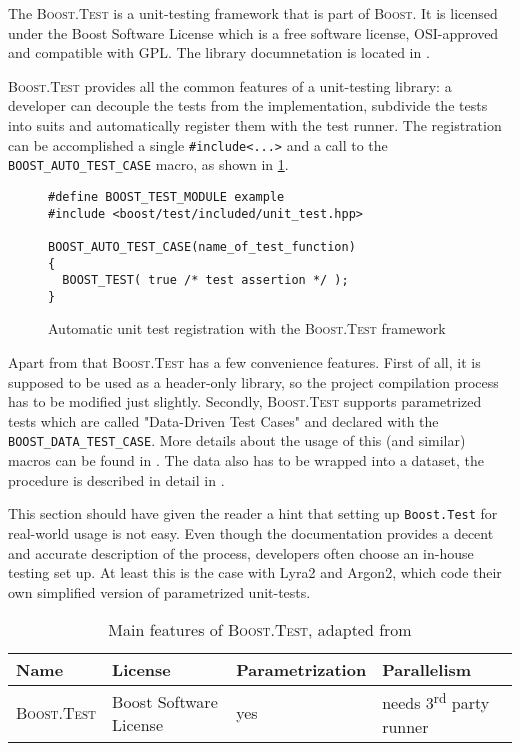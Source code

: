 The \textsc{Boost.Test} is a unit-testing framework that is part of \textsc{Boost}. It is licensed under the Boost Software License which is a free software license, OSI-approved and compatible with GPL. The library documnetation is located in \cite{boost:2017:test-docs}.

\textsc{Boost.Test} provides all the common features of a unit-testing library: a developer can decouple the tests from the implementation, subdivide the tests into suits and automatically register them with the test runner. The registration can be accomplished a single \texttt{#include<...>} and a call to the \texttt{BOOST_AUTO_TEST_CASE} macro, as shown in \ref{figure:boost-auto-test-case}.

\begin{figure}
\centering
\begin{verbatim}
#define BOOST_TEST_MODULE example
#include <boost/test/included/unit_test.hpp>

BOOST_AUTO_TEST_CASE(name_of_test_function)
{
  BOOST_TEST( true /* test assertion */ );
}
  \end{verbatim}
  \caption{Automatic unit test registration with the \textsc{Boost.Test} framework}
  \label{figure:boost-auto-test-case}
  \end{figure}

Apart from that \textsc{Boost.Test} has a few convenience features. First of all, it is supposed to be used as a header-only library, so the project compilation process has to be modified just slightly. Secondly, \textsc{Boost.Test} supports parametrized tests which are called "Data-Driven Test Cases" and declared with the \texttt{BOOST_DATA_TEST_CASE}. More details about the usage of this (and similar) macros can be found in \cite{boost:2017:test-docs-data-macro}. The data also has to be wrapped into a dataset, the procedure is described in detail in \cite{boost:2017:test-docs-dataset}.

This section should have given the reader a hint that setting up \texttt{Boost.Test} for real-world usage is not easy. Even though the documentation provides a decent and accurate description of the process, developers often choose an in-house testing set up. At least this is the case with Lyra2 and Argon2, which code their own simplified version of parametrized unit-tests.

\begin{table}
\begin{tabular}{llll}
    Name & License & Parametrization & Parallelism \\ \hline
\textsc{Boost.Test} & Boost Software License & yes & needs 3\textsuperscript{rd} party runner
\end{tabular}
\caption{Main features of \textsc{Boost.Test}, adapted from \cite{wiki:2017:frameworks-cpp}}
\label{table:framework-features-cpp}
\end{table}

